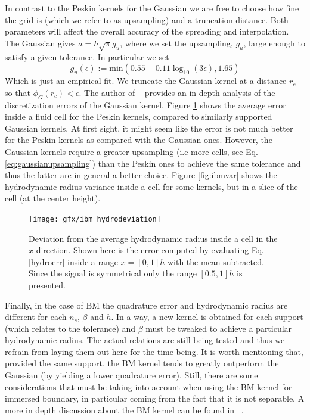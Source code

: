 \documentclass[twoside,openright,titlepage,numbers=noenddot,%
headinclude,footinclude,cleardoublepage=empty,abstract=on,
BCOR=5mm,fontsize=11pt, dvipsnames, paper=b5
]{scrreprt}
\begin{document}
In contrast to the Peskin kernels for the Gaussian we are free to choose how fine the grid is (which we refer to as upsampling) and a truncation distance. Both parameters will affect the overall accuracy of the spreading and interpolation. The Gaussian gives $a=h \sqrt{\pi} g_u$, where we set the upsampling, $g_u$, large enough to satisfy a given tolerance. In particular we set
\begin{equation}
  \label{eq:gaussianupsampling}
  g_u(\epsilon) := \text{min}\left(0.55 -0.11 \log_{10}(3\epsilon), 1.65\right)
\end{equation}
Which is just an empirical fit.
We truncate the Gaussian kernel at a distance $r_c$ so that $\phi_G(r_c) < \epsilon$. The author of ~\cite{Keaveny2014} provides an in-depth analysis of the discretization errors of the Gaussian kernel.
Figure \ref{fig:ibm_hydrovar} shows the average error inside a fluid cell for the Peskin kernels, compared to similarly supported Gaussian kernels. At first sight, it might seem like the error is not much better for the Peskin kernels as compared with the Gaussian ones. However, the Gaussian kernels require a greater upsampling (i.e more cells, see Eq. \eqref{eq:gaussianupsampling}) than the Peskin ones to achieve the same tolerance and thus the latter are in general a better choice. Figure \ref{fig:ibmvar} shows the hydrodynamic radius variance inside a cell for some kernels, but in a slice of the cell (at the center height).
\begin{figure}[H]
\texttt{[image: gfx/ibm\_hydrodeviation]}
\caption[ ]{Deviation from the average hydrodynamic radius inside a cell in the $x$ direction. Shown here is the error computed by evaluating Eq. \eqref{hydroerr} inside a range $x=[0, 1]h$ with the mean subtracted. Since the signal is symmetrical only the range $[0.5, 1]h$ is presented.}
\label{fig:ibm_hydrovar}
\end{figure}
Finally, in the case of BM the quadrature error and hydrodynamic radius are different for each $n_s$, $\beta$ and $h$. In a way, a new kernel is obtained for each support (which relates to the tolerance) and $\beta$ must be tweaked to achieve a particular hydrodynamic radius. The actual relations are still being tested and thus we refrain from laying them out here for the time being. It is worth mentioning that, provided the same support, the BM kernel tends to greatly outperform the Gaussian (by yielding a lower quadrature error). Still, there are some considerations that must be taking into account when using the BM kernel for immersed boundary, in particular coming from the fact that it is not separable. A more in depth discussion about the BM kernel can be found in ~\cite{Barnett2019}.
\end{document}
